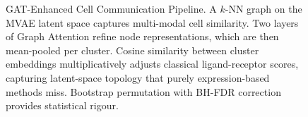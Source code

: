 \documentclass[11pt,a4paper]{article}
\begin{document}
\begin{figure}[!ht]
\caption{GAT-Enhanced Cell Communication Pipeline. A $k$-NN graph on the MVAE latent space captures multi-modal cell similarity. Two layers of Graph Attention refine node representations, which are then mean-pooled per cluster. Cosine similarity between cluster embeddings multiplicatively adjusts classical ligand-receptor scores, capturing latent-space topology that purely expression-based methods miss. Bootstrap permutation with BH-FDR correction provides statistical rigour.}
\label{fig:gat_comm_flow}
\end{figure}
\end{document}
